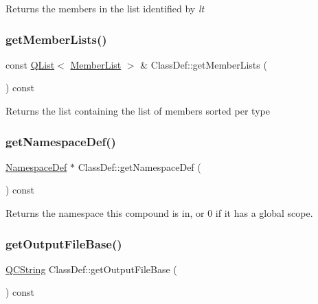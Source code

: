 Returns the members in the list identified by {\itshape lt} \mbox{\label{class_class_def_a6748470a98331298884063a451e2f848}} 
\subsubsection{\texorpdfstring{getMemberLists()}{getMemberLists()}}
{\footnotesize\ttfamily const \mbox{\hyperlink{class_q_list}{Q\+List}}$<$ \mbox{\hyperlink{class_member_list}{Member\+List}} $>$ \& Class\+Def\+::get\+Member\+Lists (\begin{DoxyParamCaption}{ }\end{DoxyParamCaption}) const}

Returns the list containing the list of members sorted per type \mbox{\label{class_class_def_a6fa9e94130e102fd87d03dbf761eab44}} 
\subsubsection{\texorpdfstring{getNamespaceDef()}{getNamespaceDef()}}
{\footnotesize\ttfamily \mbox{\hyperlink{class_namespace_def}{Namespace\+Def}} $\ast$ Class\+Def\+::get\+Namespace\+Def (\begin{DoxyParamCaption}{ }\end{DoxyParamCaption}) const}

Returns the namespace this compound is in, or 0 if it has a global scope. \mbox{\label{class_class_def_a0031d083ee93ea5a0337051b4bc97719}} 
\subsubsection{\texorpdfstring{getOutputFileBase()}{getOutputFileBase()}}
{\footnotesize\ttfamily \mbox{\hyperlink{class_q_c_string}{Q\+C\+String}} Class\+Def\+::get\+Output\+File\+Base (\begin{DoxyParamCaption}{ }\end{DoxyParamCaption}) const\hspace{0.3cm}{\ttfamily [virtual]}}


